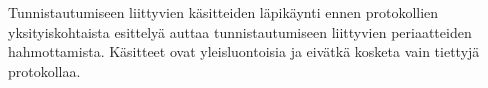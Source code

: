 Tunnistautumiseen liittyvien käsitteiden läpikäynti ennen protokollien yksityiskohtaista esittelyä auttaa tunnistautumiseen liittyvien periaatteiden hahmottamista. Käsitteet ovat yleisluontoisia ja eivätkä kosketa vain tiettyjä protokollaa.